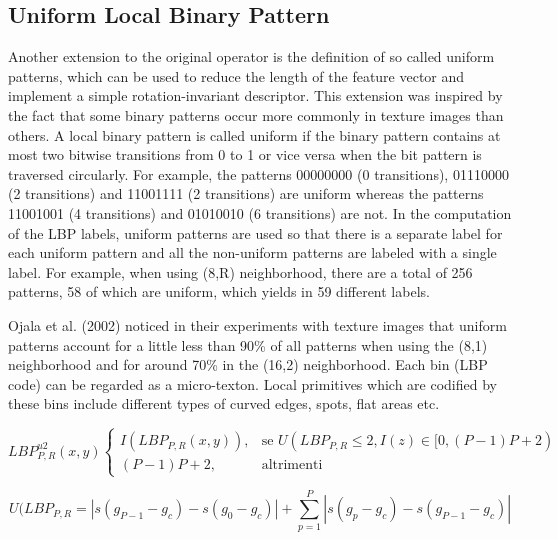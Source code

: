 \subsection{Uniform Local Binary Pattern}


Another extension to the original operator is the definition of so called uniform patterns, which can be used to reduce the length of the feature vector and implement a simple rotation-invariant descriptor. This extension was inspired by the fact that some binary patterns occur more commonly in texture images than others. A local binary pattern is called uniform if the binary pattern contains at most two bitwise transitions from 0 to 1 or vice versa when the bit pattern is traversed circularly. For example, the patterns 00000000 (0 transitions), 01110000 (2 transitions) and 11001111 (2 transitions) are uniform whereas the patterns 11001001 (4 transitions) and 01010010 (6 transitions) are not. In the computation of the LBP labels, uniform patterns are used so that there is a separate label for each uniform pattern and all the non-uniform patterns are labeled with a single label. For example, when using (8,R) neighborhood, there are a total of 256 patterns, 58 of which are uniform, which yields in 59 different labels.

Ojala et al. (2002) noticed in their experiments with texture images that uniform patterns account for a little less than 90\% of all patterns when using the (8,1) neighborhood and for around 70\% in the (16,2) neighborhood. Each bin (LBP code) can be regarded as a micro-texton. Local primitives which are codified by these bins include different types of curved edges, spots, flat areas etc. 

\begin{equation}
LBP_{P,R}^{u2}(x, y)	
\begin{cases} 
I(LBP_{P,R}(x, y)), & \mbox{se } U(LBP_{P,R} \le 2, I(z) \in [0, (P-1)P+2 )   \\
(P-1)P+2, & \mbox{altrimenti}
\end{cases}
\end{equation}

\begin{equation}
U(LBP_{P,R} = |s( g_{P-1} - g_{c}) - s(g_{0} - g_{c}) | + \sum_{p = 1}^{P} |s(g_{p} - g_{c}) - s( g_{P-1} - g_{c}) |
\end{equation}


